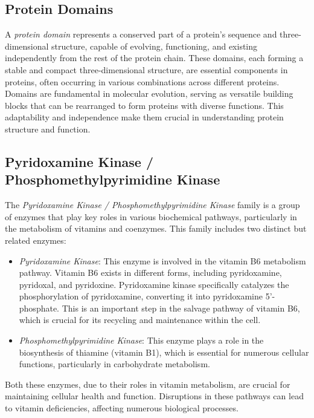 \documentclass[10pt,twocolumn,letterpaper]{article}
\begin{document}
\subsection{Protein Domains}

A \textit{protein domain} represents a conserved part of a protein's sequence and three-dimensional structure, capable of evolving, functioning, and existing independently from the rest of the protein chain. These domains, each forming a stable and compact three-dimensional structure, are essential components in proteins, often occurring in various combinations across different proteins. Domains are fundamental in molecular evolution, serving as versatile building blocks that can be rearranged to form proteins with diverse functions. This adaptability and independence make them crucial in understanding protein structure and function.

\subsection{Pyridoxamine Kinase / Phosphomethylpyrimidine Kinase}

The \textit{Pyridoxamine Kinase / Phosphomethylpyrimidine Kinase}\cite{family} family is a group of enzymes that play key roles in various biochemical pathways, particularly in the metabolism of vitamins and coenzymes. This family includes two distinct but related enzymes:

\begin{itemize}
\item \textit{Pyridoxamine Kinase}: This enzyme is involved in the vitamin B6 metabolism pathway. Vitamin B6 exists in different forms, including pyridoxamine, pyridoxal, and pyridoxine. Pyridoxamine kinase specifically catalyzes the phosphorylation of pyridoxamine, converting it into pyridoxamine 5'-phosphate. This is an important step in the salvage pathway of vitamin B6, which is crucial for its recycling and maintenance within the cell.

\item \textit{Phosphomethylpyrimidine Kinase}: This enzyme plays a role in the biosynthesis of thiamine (vitamin B1), which is essential for numerous cellular functions, particularly in carbohydrate metabolism.
\end{itemize}

Both these enzymes, due to their roles in vitamin metabolism, are crucial for maintaining cellular health and function. Disruptions in these pathways can lead to vitamin deficiencies, affecting numerous biological processes.
\end{document}

